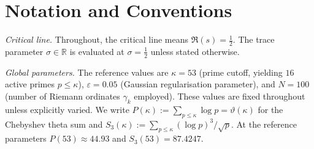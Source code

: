 \documentclass[11pt]{article}
\begin{document}
\section*{Notation and Conventions}
\label{sec:notation}

\emph{Critical line.}
Throughout, the critical line means $\Re(s)=\tfrac12$.
The trace parameter $\sigma\in\mathbb{R}$ is evaluated at $\sigma=\tfrac12$
unless stated otherwise.

\medskip
\emph{Global parameters.}
The reference values are $\kappa=53$ (prime cutoff, yielding $16$ active
primes $p\le\kappa$), $\varepsilon=0.05$ (Gaussian regularisation
parameter), and $N=100$ (number of Riemann ordinates $\gamma_k$ employed).
These values are fixed throughout unless explicitly varied.
We write $P(\kappa):=\sum_{p\le\kappa}\log p=\vartheta(\kappa)$ for the
Chebyshev theta sum and
$S_3(\kappa):=\sum_{p\le\kappa}(\log p)^3/\sqrt{p}$.
At the reference parameters $P(53)\approx 44.93$ and $S_3(53)=87.4247$.
\end{document}
